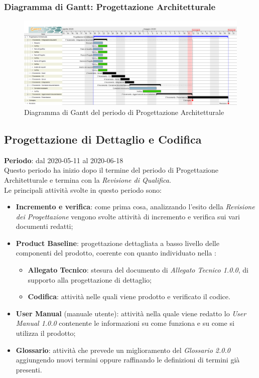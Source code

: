 	\subsubsection{Diagramma di Gantt: Progettazione Architetturale}
		\begin{figure}[h]
			\centering
			\includegraphics[width=1.1\textwidth]{./res/img/DiagrammiGantt/prog_arch_gantt.png}
			\caption{Diagramma di Gantt del periodo di Progettazione Architetturale}
		\end{figure}
\newpage
\subsection{Progettazione di Dettaglio e Codifica}
\textbf{Periodo}: dal 2020-05-11 al 2020-06-18 \\
Questo periodo ha inizio dopo il termine del periodo di Progettazione Architetturale e termina con la \textit{Revisione di Qualifica}. \\
Le principali attività svolte in questo periodo sono:
\begin{itemize}
	\item \textbf{Incremento e verifica}: come prima cosa, analizzando l'esito della \textit{Revisione dei Progettazione} vengono svolte attività di incremento e verifica sui vari documenti redatti;
	\item \textbf{Product Baseline}: progettazione dettagliata a basso livello delle componenti del prodotto, coerente con quanto individuato nella \TB{}:
	\begin{itemize}
		\item \textbf{Allegato Tecnico}: stesura del documento di \textit{Allegato Tecnico 1.0.0}, di supporto alla progettazione di dettaglio;
		\item \textbf{Codifica}: attività nelle quali viene prodotto e verificato il codice.
	\end{itemize}
	\item \textbf{User Manual} (manuale utente): attività nella quale viene redatto lo \textit{User Manual 1.0.0} contenente le informazioni su come funziona e su come si utilizza il prodotto;
	\item \textbf{Glossario}: attività che prevede un miglioramento del \textit{Glossario 2.0.0} aggiungendo nuovi termini oppure raffinando le definizioni di termini già presenti.
\end{itemize}
